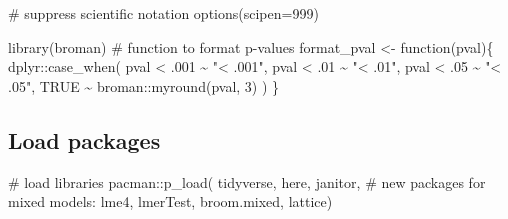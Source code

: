 \documentclass[
  letterpaper,
  DIV=11,
  numbers=noendperiod]{scrartcl}
\newenvironment{Shaded}{\begin{snugshade}}{\end{snugshade}}
\newcommand{\AttributeTok}[1]{\textcolor[rgb]{0.40,0.45,0.13}{#1}}
\newcommand{\CommentTok}[1]{\textcolor[rgb]{0.37,0.37,0.37}{#1}}
\newcommand{\ConstantTok}[1]{\textcolor[rgb]{0.56,0.35,0.01}{#1}}
\newcommand{\ControlFlowTok}[1]{\textcolor[rgb]{0.00,0.23,0.31}{#1}}
\newcommand{\DecValTok}[1]{\textcolor[rgb]{0.68,0.00,0.00}{#1}}
\newcommand{\FunctionTok}[1]{\textcolor[rgb]{0.28,0.35,0.67}{#1}}
\newcommand{\NormalTok}[1]{\textcolor[rgb]{0.00,0.23,0.31}{#1}}
\newcommand{\OtherTok}[1]{\textcolor[rgb]{0.00,0.23,0.31}{#1}}
\newcommand{\SpecialCharTok}[1]{\textcolor[rgb]{0.37,0.37,0.37}{#1}}
\newcommand{\StringTok}[1]{\textcolor[rgb]{0.13,0.47,0.30}{#1}}
\begin{document}
\begin{Shaded}
\begin{Highlighting}[]
\CommentTok{\# suppress scientific notation}
\FunctionTok{options}\NormalTok{(}\AttributeTok{scipen=}\DecValTok{999}\NormalTok{)}
\end{Highlighting}
\end{Shaded}

\begin{Shaded}
\begin{Highlighting}[]
\FunctionTok{library}\NormalTok{(broman)}
\CommentTok{\# function to format p{-}values}
\NormalTok{format\_pval }\OtherTok{\textless{}{-}} \ControlFlowTok{function}\NormalTok{(pval)\{}
\NormalTok{    dplyr}\SpecialCharTok{::}\FunctionTok{case\_when}\NormalTok{(}
\NormalTok{        pval }\SpecialCharTok{\textless{}}\NormalTok{ .}\DecValTok{001} \SpecialCharTok{\textasciitilde{}} \StringTok{"\textless{} .001"}\NormalTok{,}
\NormalTok{        pval }\SpecialCharTok{\textless{}}\NormalTok{ .}\DecValTok{01} \SpecialCharTok{\textasciitilde{}} \StringTok{"\textless{} .01"}\NormalTok{,}
\NormalTok{        pval }\SpecialCharTok{\textless{}}\NormalTok{ .}\DecValTok{05} \SpecialCharTok{\textasciitilde{}} \StringTok{"\textless{} .05"}\NormalTok{,}
        \ConstantTok{TRUE} \SpecialCharTok{\textasciitilde{}}\NormalTok{ broman}\SpecialCharTok{::}\FunctionTok{myround}\NormalTok{(pval, }\DecValTok{3}\NormalTok{)}
\NormalTok{    )}
\NormalTok{\}}
\end{Highlighting}
\end{Shaded}

\hypertarget{load-packages}{%
\subsection*{Load packages}\label{load-packages}}

\begin{Shaded}
\begin{Highlighting}[]
\CommentTok{\# load libraries}
\NormalTok{pacman}\SpecialCharTok{::}\FunctionTok{p\_load}\NormalTok{(}
\NormalTok{               tidyverse,}
\NormalTok{               here,}
\NormalTok{               janitor,}
               \CommentTok{\# new packages for mixed models:}
\NormalTok{               lme4,}
\NormalTok{               lmerTest,}
\NormalTok{               broom.mixed,}
\NormalTok{               lattice)}
\end{Highlighting}
\end{Shaded}
\end{document}
